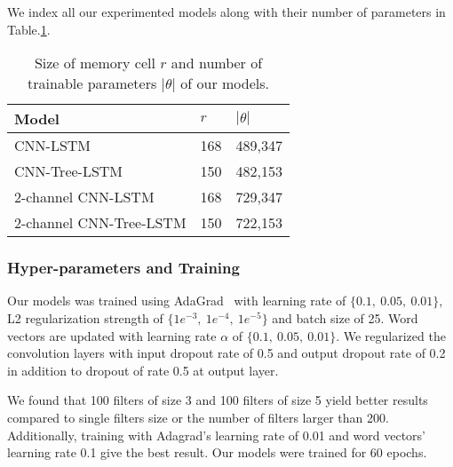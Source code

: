 We index all our experimented models along with their number of parameters in Table.\ref{table:paramtable}.
\begin{table}[H]
	\centering
	\caption{Size of memory cell \(r\) and number of trainable parameters \(\left\vert{\theta}\right\vert\) of our models. 
	}
	\label{table:paramtable}
	\begin{tabular}{|l|l|l|}
		\hline
		Model & \(r\) & \(\left\vert{\theta}\right\vert\) \\ \hline
		CNN-LSTM                 & 168         & 489,347          \\
		CNN-Tree-LSTM            & 150         & 482,153          \\
		2-channel CNN-LSTM       & 168         & 729,347          \\
		2-channel CNN-Tree-LSTM  & 150         & 
		722,153 \\
		\hline
	\end{tabular}
\end{table}
\subsubsection{Hyper-parameters and Training}
Our models was trained using AdaGrad~\cite{duchi2011adaptive} with learning rate of $\{0.1,~ 0.05,~ 0.01\}$, L2 regularization strength of $\{1e^{-3},~ 1e^{-4}, ~ 1e^{-5} \}$ and batch size of 25.
Word vectors are updated with learning rate $\alpha$ of $\{0.1,~0.05, ~0.01\}$.
We regularized the convolution layers with input dropout rate of 0.5 and output dropout rate of 0.2 in addition to dropout of rate 0.5 at output layer.

We found that 100 filters of size 3 and 100 filters of size 5 yield better results compared to single filters size or the number of filters larger than 200. 
Additionally, training with Adagrad's learning rate of 0.01 and word vectors' learning rate 0.1 give the best result. 
Our models were trained for 60 epochs.
